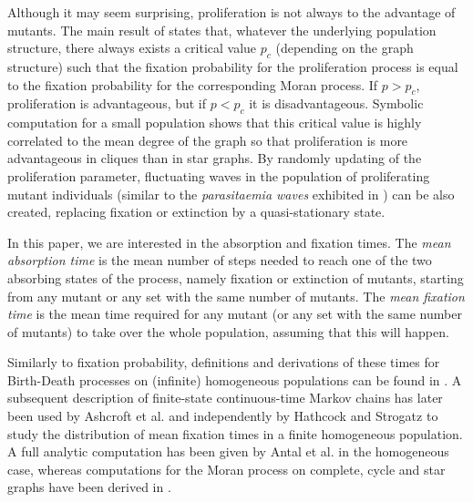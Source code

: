 \documentclass[a4paper,english,10pt]{amsart}
\theoremstyle{definition}
\numberwithin{equation}{section}
\begin{document}
Although it may seem surprising, proliferation is not always to the advantage of mutants. The main result of \cite{AlcaldeGuerberoffLozano2022} states that, whatever the underlying population structure, there always exists a critical value $p_c$ (depending on the graph structure) such that the fixation probability for the proliferation process is equal to the fixation probability for the corresponding Moran process. If $p > p_c$, proliferation is advantageous, but if $p < p_c$ it is disadvantageous. Symbolic computation for a small population shows that this critical value is highly correlated to the mean degree of the graph so that proliferation is more advantageous in cliques than in star graphs. By randomly updating of the proliferation parameter, fluctuating waves in the population of proliferating mutant individuals (similar to the \emph{parasitaemia waves} exhibited in \cite{Gustavo}) can be also created, replacing fixation or extinction by a quasi-stationary state.

In this paper, we are interested in the absorption and fixation times. The \emph{mean absorption time} is the mean number of steps needed to reach one of the two absorbing states of the process, namely fixation or extinction of mutants, starting from any mutant or any set with the same number of mutants. The \emph{mean fixation time} is the mean time required for any mutant (or any set with the same number of mutants) to take over the whole population, assuming that this will happen. 

Similarly to fixation probability, definitions and derivations of these times for Birth-Death processes on (infinite) homogeneous populations can be found in \cite[Chapter 4, Section 7]{KT}.  A subsequent description of finite-state continuous-time Markov chains \cite[Chapter 4, Section 8]{KT} has later been used by Ashcroft et al. \cite{Traulsen2015} and independently by Hathcock and Strogatz \cite{HathcockStrogatz} to study the distribution of mean fixation times in a finite homogeneous population. A full analytic computation has been given by Antal et al. \cite{Antal2006} in the homogeneous case, whereas computations for the Moran process on complete, cycle and star graphs have been derived in \cite{BHR, H}.
\end{document}

